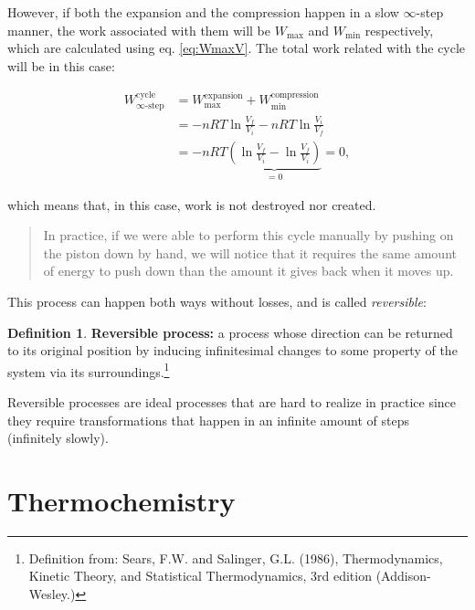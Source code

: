 \documentclass[
]{book}
\theoremstyle{definition}
\newtheorem{definition}{Definition}[chapter]
\theoremstyle{definition}
\theoremstyle{definition}
\theoremstyle{remark}
\begin{document}
However, if both the expansion and the compression happen in a slow \(\infty\)-step manner, the work associated with them will be \(W_{\text{max}}\) and \(W_{\text{min}}\) respectively, which are calculated using eq. \eqref{eq:WmaxV}. The total work related with the cycle will be in this case:

\begin{equation}
\begin{aligned}
W^{\text{cycle}}_{\infty\text{-step}} {} & = W^{\text{expansion}}_{\text{max}}+W^{\text{compression}}_{\text{min}} \\
 & = -nRT \ln \frac{V_f}{V_i}-nRT \ln \frac{V_i}{V_f} \\
 & = -nRT \underbrace{\left( \ln \frac{V_f}{V_i} - \ln \frac{V_f}{V_i} \right)}_{=0} = 0,
\end{aligned}
  \label{eq:Wtot1}
\end{equation}

which means that, in this case, work is not destroyed nor created.

\begin{quote}
In practice, if we were able to perform this cycle manually by pushing on the piston down by hand, we will notice that it requires the same amount of energy to push down than the amount it gives back when it moves up.
\end{quote}

This process can happen both ways without losses, and is called \emph{reversible}:

\begin{definition}
\protect\hypertarget{def:reversible}{}{\label{def:reversible} }\textbf{Reversible process:} a process whose direction can be returned to its original position by inducing infinitesimal changes to some property of the system via its surroundings.\footnote{Definition from: Sears, F.W. and Salinger, G.L. (1986), Thermodynamics, Kinetic Theory, and Statistical Thermodynamics, 3rd edition (Addison-Wesley.)}
\end{definition}

Reversible processes are ideal processes that are hard to realize in practice since they require transformations that happen in an infinite amount of steps (infinitely slowly).

\hypertarget{Thermochemistry}{%
\chapter{Thermochemistry}\label{Thermochemistry}}
\end{document}

